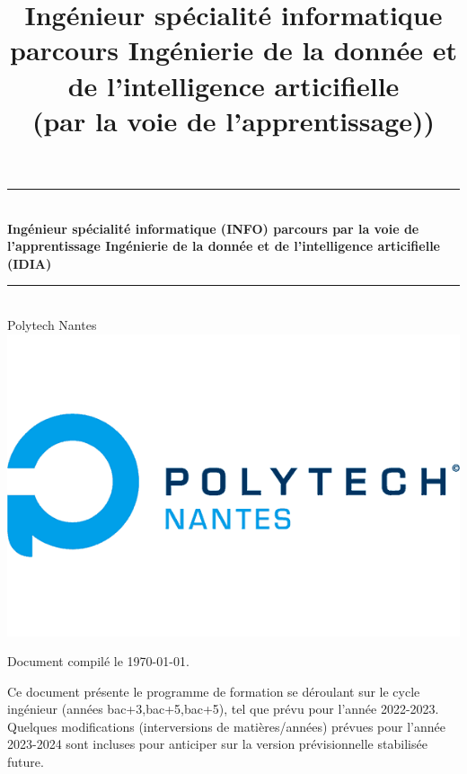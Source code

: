 \documentclass[a4paper, 11pt]{article}
\title{Ingénieur spécialité informatique \\ parcours Ingénierie de la donnée et de l'intelligence articifielle \\ (par la voie de l'apprentissage))}
\date{}
\begin{document}
\begin{titlepage}
    \begin{centering}
    \newcommand{\HRule}{\rule{\linewidth}{0.5mm}}

    \HRule \\[0.4cm]
    { \huge \bfseries Ingénieur spécialité informatique (INFO)\linebreak 
    \vspace*{1cm} \huge parcours 
    \linebreak par la voie de l'apprentissage \vspace*{1cm} \linebreak
     Ingénierie de la donnée 
     \linebreak et de l'intelligence articifielle (IDIA) 
     \linebreak \vspace*{1cm} \\[0.15cm] }
    \HRule \\[1.5cm]
    \Huge Polytech Nantes
    \\[1cm]
    \includegraphics[scale=0.4]{polytech-nantes.png}
    \end{centering}

\vfill

Document compilé le \today.
\end{titlepage}

\vfill

Ce document présente le programme de formation se déroulant sur le cycle ingénieur (années bac+3,bac+5,bac+5), tel que prévu pour l'année 2022-2023. Quelques modifications (interversions de matières/années) prévues pour l'année 2023-2024 sont incluses pour anticiper sur la version prévisionnelle stabilisée future.
\end{document}
